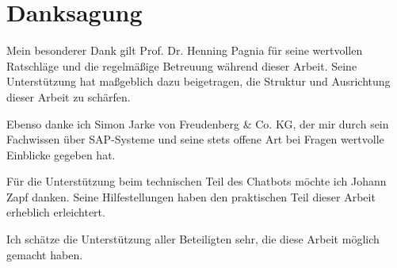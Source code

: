 \chapter*{Danksagung}

Mein besonderer Dank gilt Prof. Dr. Henning Pagnia für seine wertvollen Ratschläge und die regelmäßige Betreuung während dieser Arbeit. Seine Unterstützung hat maßgeblich dazu beigetragen, die Struktur und Ausrichtung dieser Arbeit zu schärfen.

Ebenso danke ich Simon Jarke von Freudenberg \& Co. KG, der mir durch sein Fachwissen über SAP-Systeme und seine stets offene Art bei Fragen wertvolle Einblicke gegeben hat.

Für die Unterstützung beim technischen Teil des Chatbots möchte ich Johann Zapf danken. Seine Hilfestellungen haben den praktischen Teil dieser Arbeit erheblich erleichtert.

Ich schätze die Unterstützung aller Beteiligten sehr, die diese Arbeit möglich gemacht haben.